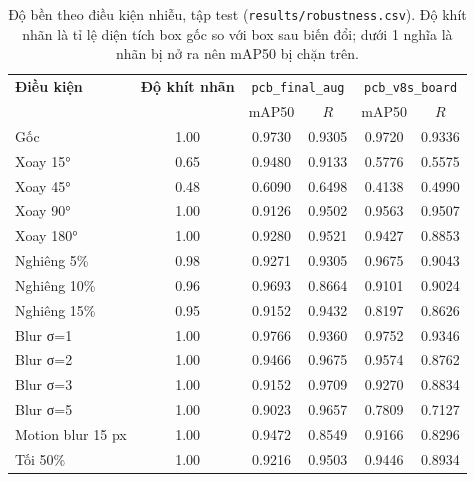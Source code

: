 \begin{table}[H]
\centering
\small
\caption{Độ bền theo điều kiện nhiễu, tập test (\texttt{results/robustness.csv}). Độ khít nhãn là tỉ lệ diện tích box gốc so với box sau biến đổi; dưới 1 nghĩa là nhãn bị nở ra nên mAP50 bị chặn trên.}\label{tab:chiunhieu_test}
\begin{tabular}{l|c|cc|cc}
\toprule
\textbf{Điều kiện} & \textbf{Độ khít nhãn} & \multicolumn{2}{c}{\texttt{pcb\_final\_aug}} & \multicolumn{2}{c}{\texttt{pcb\_v8s\_board}} \\
 &  & mAP50 & $R$ & mAP50 & $R$ \\ \midrule
Gốc & 1.00 & 0.9730 & 0.9305 & 0.9720 & 0.9336 \\
Xoay 15° & 0.65 & 0.9480 & 0.9133 & 0.5776 & 0.5575 \\
Xoay 45° & 0.48 & 0.6090 & 0.6498 & 0.4138 & 0.4990 \\
Xoay 90° & 1.00 & 0.9126 & 0.9502 & 0.9563 & 0.9507 \\
Xoay 180° & 1.00 & 0.9280 & 0.9521 & 0.9427 & 0.8853 \\
Nghiêng 5\% & 0.98 & 0.9271 & 0.9305 & 0.9675 & 0.9043 \\
Nghiêng 10\% & 0.96 & 0.9693 & 0.8664 & 0.9101 & 0.9024 \\
Nghiêng 15\% & 0.95 & 0.9152 & 0.9432 & 0.8197 & 0.8626 \\
Blur σ=1 & 1.00 & 0.9766 & 0.9360 & 0.9752 & 0.9346 \\
Blur σ=2 & 1.00 & 0.9466 & 0.9675 & 0.9574 & 0.8762 \\
Blur σ=3 & 1.00 & 0.9152 & 0.9709 & 0.9270 & 0.8834 \\
Blur σ=5 & 1.00 & 0.9023 & 0.9657 & 0.7809 & 0.7127 \\
Motion blur 15 px & 1.00 & 0.9472 & 0.8549 & 0.9166 & 0.8296 \\
Tối 50\% & 1.00 & 0.9216 & 0.9503 & 0.9446 & 0.8934 \\
\bottomrule
\end{tabular}
\end{table}
